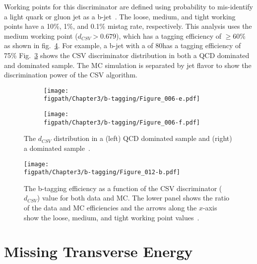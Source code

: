 Working points for this discriminator are defined using probability to mis-identify a light quark or gluon jet as a b-jet~\cite{CMS-PAS-BTV-13-001}.
The loose, medium, and tight working points have a 10\%, 1\%, and 0.1\% mistag rate, respectively. 
This analysis uses the medium working point ($d_{CSV}>0.679$), which has a tagging efficiency of $\geq60\%$ as shown in fig.~\ref{fig:bDiscriminator_efficiency}.
For example, a b-jet with a \pt of 80\gev has a tagging efficiency of 75\%
Fig.~\ref{fig:bDiscriminator} shows the CSV discriminator distribution in both a QCD dominated and \ttbar dominated sample.
The MC simulation is separated by jet flavor to show the discrimination power of the CSV algorithm.
\begin{figure}[!hbt]
    \centering
    \begin{subfigure}[t]{0.48\textwidth}
        \texttt{[image: \\figpath/Chapter3/b-tagging/Figure\_006-e.pdf]}
        \caption{}
        \label{fig:bDiscriminator_QCD}
    \end{subfigure}
    \begin{subfigure}[t]{0.48\textwidth}
        \texttt{[image: \\figpath/Chapter3/b-tagging/Figure\_006-f.pdf]}
        \caption{}
        \label{fig:bDiscriminator_ttbar}
    \end{subfigure}
    \caption{The $d_{CSV}$ distribution in a (left) QCD dominated sample and (right) a \ttbar dominated sample~\cite{CMS-PAS-BTV-13-001}.}
    \label{fig:bDiscriminator}
\end{figure}

\begin{figure}[!hbt]
    \centering
    \texttt{[image: \\figpath/Chapter3/b-tagging/Figure\_012-b.pdf]}
    \caption{The b-tagging efficiency as a function of the CSV discriminator ($d_{CSV}$) value for both data and MC. The lower panel shows the ratio of the data and MC efficiencies and the arrows along the $x$-axis show the loose, medium, and tight working point values~\cite{CMS-PAS-BTV-13-001}.}
    \label{fig:bDiscriminator_efficiency}
\end{figure}

\section{Missing Transverse Energy}
\label{sec:MET}


